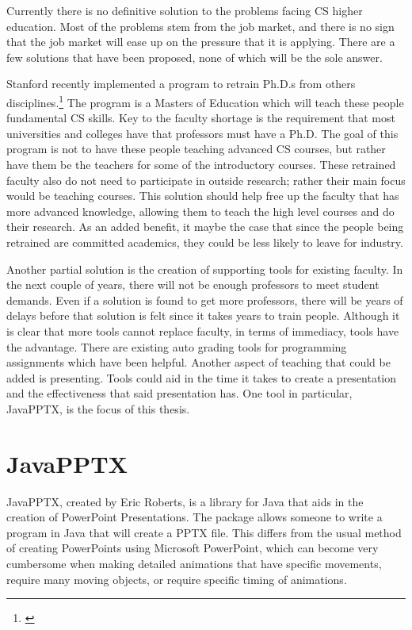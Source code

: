 \documentclass[12pt,twoside]{reedthesis}
\begin{document}
Currently there is no definitive solution to the problems facing CS higher education. Most of the problems stem from the job market, and there is no sign that the job market will ease up on the pressure that it is applying. There are a few solutions that have been proposed, none of which will be the sole answer.

Stanford recently implemented a program to retrain Ph.D.s from others disciplines.\footnote{\cite{starkman_stanford_0400}} The program is a Masters of Education which will teach these people fundamental CS skills. Key to the faculty shortage is the requirement that most universities and colleges have that professors must have a Ph.D. The goal of this program is not to have these people teaching advanced CS courses, but rather have them be the teachers for some of the introductory courses. These retrained faculty also do not need to participate in outside research; rather their main focus would be teaching courses. This solution should help free up the faculty that has more advanced knowledge, allowing them to teach the high level courses and do their research. As an added benefit, it maybe the case that since the people being retrained are committed academics, they could be less likely to leave for industry. 

Another partial solution is the creation of supporting tools for existing faculty. In the next couple of years, there will not be enough professors to meet student demands. Even if a solution is found to get more professors, there will be years of delays before that solution is felt since it takes years to train people. Although it is clear that more tools cannot replace faculty, in terms of immediacy, tools have the advantage. There are existing auto grading tools for programming assignments which have been helpful. Another aspect of teaching that could be added is presenting. Tools could aid in the time it takes to create a presentation and the effectiveness that said presentation has. One tool in particular, JavaPPTX, is the focus of this thesis.


\section{JavaPPTX}
JavaPPTX, created by Eric Roberts, is a library for Java that aids in the creation of PowerPoint Presentations. The package allows someone to write a program in Java that will create a PPTX file. This differs from the usual method of creating PowerPoints using Microsoft PowerPoint, which can become very cumbersome when making detailed animations that have specific movements, require many moving objects, or require specific timing of animations.
\end{document}
